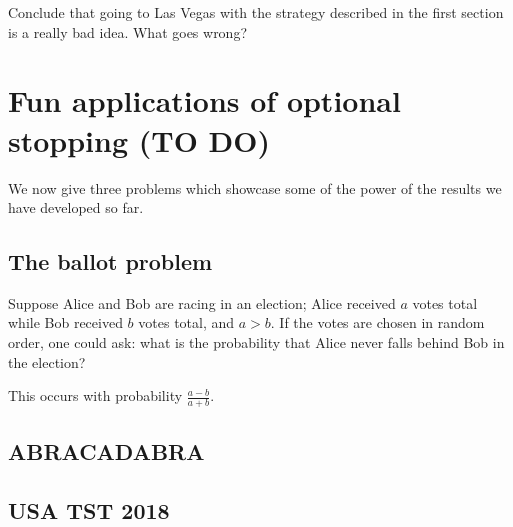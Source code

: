 \begin{exercise}
	Conclude that going to Las Vegas with the strategy
	described in the first section is a really bad idea.
	What goes wrong?
\end{exercise}

\section{Fun applications of optional stopping (TO DO)}
We now give three problems which showcase some of the power of
the results we have developed so far.

\subsection{The ballot problem}
Suppose Alice and Bob are racing in an election;
Alice received $a$ votes total while Bob received $b$ votes total, and $a > b$.
If the votes are chosen in random order,
one could ask: what is the probability that Alice never falls behind
Bob in the election?


\begin{proposition}
	This occurs with probability $\frac{a-b}{a+b}$.
\end{proposition}


\subsection{ABRACADABRA}


\subsection{USA TST 2018}

\section{\problemhead}

